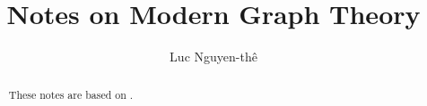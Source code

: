 \documentclass[a4paper,11pt]{article}
\title{Notes on Modern Graph Theory}
\author{Luc Nguyen-th\^e}
\begin{document}
\maketitle

\begin{abstract}
    These notes are based on \cite{main}.
\end{abstract}

\tableofcontents





\end{document}
